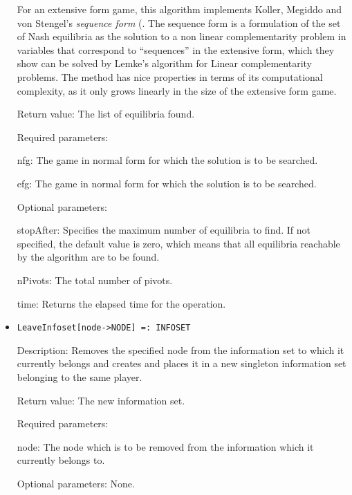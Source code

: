 \begin{itemize}
For an extensive form game, this algorithm implements Koller, Megiddo
and von Stengel's {\em sequence form} (\cite[1994]{KolMegSte:94}. The
sequence form is a formulation of the set of Nash equilibria as the
solution to a non linear complementarity problem in variables that
correspond to ``sequences'' in the extensive form, which they show can
be solved by Lemke's algorithm for Linear complementarity problems.
The method has nice properties in terms of its computational
complexity, as it only grows linearly in the size of the extensive
form game.  

\item
[Return value:] The list of equilibria found.
\item
[Required parameters:]\hfil\null

\bd
\item
[nfg:] The game in normal form for which the solution is to be
searched.
\item
[efg:] The game in normal form for which the solution is to be
searched.
\ed

\item
[Optional parameters:]\hfil\null

\bd
\item
[stopAfter:] Specifies the maximum number of equilibria to find.  If
not specified, the default value is zero, which means that all
equilibria reachable by the algorithm are to be found.
\item
[nPivots:] The total number of pivots. 
\item
[time:] Returns the elapsed time for the operation.
\ed
\ed

\item
\protect \large \begin{verbatim}
LeaveInfoset[node->NODE] =: INFOSET
\end{verbatim}\normalsize

\bd
\item
[Description:] Removes the specified node from the information set to
which it currently belongs and creates and places it in a new
singleton information set belonging to the same player.
\item
[Return value:] The new information set.
\item
[Required parameters:]\hfil\null
	  
\bd
\item
[node:] The node which is to be removed from the information which it
currently belongs to.
\ed

\item
[Optional parameters:] None.
\ed


\end{itemize}
